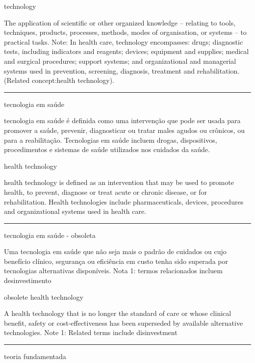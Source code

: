 \documentclass[
  openany]{book}
\begin{document}
technology

The application of scientific or other organized knowledge -- relating to tools, techniques, products, processes, methods, modes of organisation, or systems -- to practical tasks. Note: In health care, technology encompasses: drugs; diagnostic tests, including indicators and reagents; devices; equipment and supplies; medical and surgical procedures; support systems; and organizational and managerial systems used in prevention, screening, diagnosis, treatment and rehabilitation. (Related concept:health technology).

\begin{center}\rule{0.5\linewidth}{0.5pt}\end{center}

tecnologia em saúde

tecnologia em saúde é definida como uma intervenção que pode ser usada para promover a saúde, prevenir, diagnosticar ou tratar males agudos ou crônicos, ou para a reabilitação. Tecnologias em saúde incluem drogas, dispositivos, procedimentos e sistemas de saúde utilizados nos cuidados da saúde.

health technology

health technology is defined as an intervention that may be used to promote health, to prevent, diagnose or treat acute or chronic disease, or for rehabilitation. Health technologies include pharmaceuticals, devices, procedures and organizational systems used in health care.

\begin{center}\rule{0.5\linewidth}{0.5pt}\end{center}

tecnologia em saúde - obsoleta

Uma tecnologia em saúde que não seja mais o padrão de cuidados ou cujo benefício clínico, segurança ou eficiência em custo tenha sido superada por tecnologias alternativas disponíveis. Nota 1: termos relacionados incluem desinvestimento

obsolete health technology

A health technology that is no longer the standard of care or whose clinical benefit, safety or cost-effectiveness has been superseded by available alternative technologies. Note 1: Related terms include disinvestment

\begin{center}\rule{0.5\linewidth}{0.5pt}\end{center}

teoria fundamentada
\end{document}
